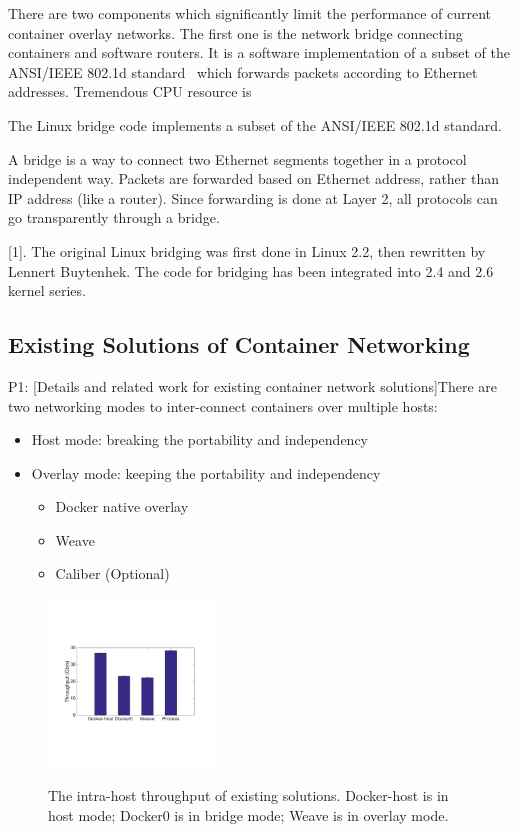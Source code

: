 There are two components which significantly limit the performance
of current container overlay networks. The first one is the network bridge
connecting containers and software routers. It is a software implementation
of a subset of the ANSI/IEEE 802.1d standard~\cite{?} which forwards packets
according to Ethernet addresses. Tremendous CPU resource is 



The Linux bridge code implements a subset of the ANSI/IEEE 802.1d standard.


A bridge is a way to connect two Ethernet segments together in a protocol independent way. Packets are forwarded based on Ethernet address, rather than IP address (like a router). Since forwarding is done at Layer 2, all protocols can go transparently through a bridge.

 [1]. The original Linux bridging was first done in Linux 2.2, then rewritten by Lennert Buytenhek. The code for bridging has been integrated into 2.4 and 2.6 kernel series.



\subsection{Existing Solutions of Container Networking}

P1: [Details and related work for existing container network solutions]There are two networking modes to inter-connect containers over multiple hosts:

\begin{itemize}
  \item Host mode: breaking the portability and independency
  \item Overlay mode: keeping the portability and independency
  \begin{itemize}
  \item Docker native overlay
  \item Weave
  \item Caliber (Optional)
  \end{itemize}  
\end{itemize}

\begin{figure}[ht]
     \centering 
     \includegraphics[width=0.4\textwidth]{figures/motivation/eval_exist_bw.pdf} 
     \label{fig:eval_exist_bw}
     \caption{The intra-host throughput of existing solutions. Docker-host is in host mode; Docker0 is in bridge mode; Weave is in overlay mode.} 
\end{figure} 

